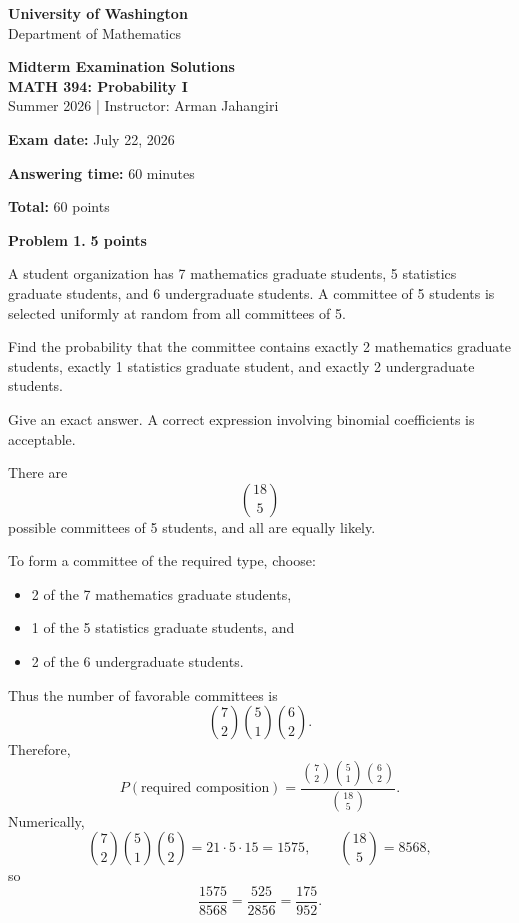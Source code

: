 \documentclass[11pt]{article}
\newcommand{\course}{MATH 394: Probability I}
\newcommand{\instructor}{Arman Jahangiri}
\newcommand{\department}{Department of Mathematics}
\newcommand{\university}{University of Washington}
\begin{document}
\begin{titlepage}
\centering
\vspace*{1.2cm}

{\Large \textbf{\university}}\\
{\large \department}

\vspace{1.4cm}

{\Huge \color{uwpurple}\textbf{Midterm Examination Solutions}}\\[0.25cm]
{\Large \textbf{\course}}\\[0.25cm]
{\large Summer 2026 \quad | \quad Instructor: \instructor}

\vspace{1cm}

\begin{tcolorbox}[
    width=0.78\textwidth,
    colback=softpurple,
    colframe=uwpurple,
    boxrule=0.9pt,
    arc=3mm
]
\centering
\textbf{Exam date:} July 22, 2026

\textbf{Answering time:} 60 minutes

\textbf{Total:} 60 points
\end{tcolorbox}

 
 
\end{titlepage}

\begin{problemheader}
\textbf{Problem 1. } \hfill \textbf{5 points}
\end{problemheader}
A student organization has 7 mathematics graduate students, 5 statistics graduate students, and 6 undergraduate students. A committee of 5 students is selected uniformly at random from all committees of 5.

Find the probability that the committee contains exactly 2 mathematics graduate students, exactly 1 statistics graduate student, and exactly 2 undergraduate students.

Give an exact answer. A correct expression involving binomial coefficients is acceptable.
\begin{solutionbox}
There are
\[
\binom{18}{5}
\]
possible committees of 5 students, and all are equally likely.

To form a committee of the required type, choose:
\begin{itemize}[leftmargin=*]
    \item 2 of the 7 mathematics graduate students,
    \item 1 of the 5 statistics graduate students, and
    \item 2 of the 6 undergraduate students.
\end{itemize}
Thus the number of favorable committees is
\[
\binom{7}{2}\binom{5}{1}\binom{6}{2}.
\]
Therefore,
\[
P(\text{required composition})
=
\frac{\binom{7}{2}\binom{5}{1}\binom{6}{2}}{\binom{18}{5}}.
\]
Numerically,
\[
\binom{7}{2}\binom{5}{1}\binom{6}{2}=21\cdot 5\cdot 15=1575,
\qquad
\binom{18}{5}=8568,
\]
so
\[
\frac{1575}{8568}=\frac{525}{2856}=\frac{175}{952}.
\]

\end{solutionbox}
\end{document}
